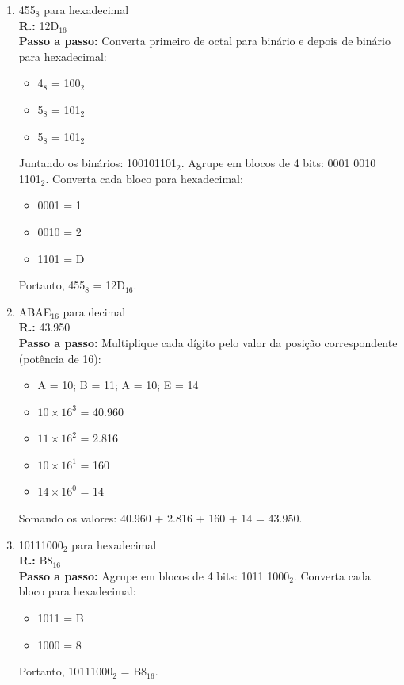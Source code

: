 \documentclass{article}[12pt]
\begin{document}
\begin{enumerate}
\begin{enumerate}
            \item 455$_8$ para hexadecimal \\
            \textbf{R.:} 12D$_{16}$ \\
            \textbf{Passo a passo:} Converta primeiro de octal para binário e depois de binário para hexadecimal:
            \begin{itemize}
                \item 4$_8$ = 100$_2$
                \item 5$_8$ = 101$_2$
                \item 5$_8$ = 101$_2$
            \end{itemize}
            Juntando os binários: 100101101$_2$. Agrupe em blocos de 4 bits: 0001 0010 1101$_2$.
            Converta cada bloco para hexadecimal:
            \begin{itemize}
                \item 0001 = 1
                \item 0010 = 2
                \item 1101 = D
            \end{itemize}
            Portanto, 455$_8$ = 12D$_{16}$.

            \item ABAE$_{16}$ para decimal \\
            \textbf{R.:} 43.950 \\
            \textbf{Passo a passo:} Multiplique cada dígito pelo valor da posição correspondente (potência de 16):
            \begin{itemize}
                \item A = 10; B = 11; A = 10; E = 14
                \item $10 \times 16^3$ = \phantom{0}40.960
                \item $11 \times 16^2$ = \phantom{00}2.816
                \item $10 \times 16^1$ = \phantom{000}160
                \item $14 \times 16^0$ = \phantom{0000}14
            \end{itemize}
            Somando os valores: 40.960 + 2.816 + 160 + 14 = 43.950.

            \item 10111000$_2$ para hexadecimal \\
            \textbf{R.:} B8$_{16}$ \\
            \textbf{Passo a passo:} Agrupe em blocos de 4 bits: 1011 1000$_2$.
            Converta cada bloco para hexadecimal:
            \begin{itemize}
                \item 1011 = B
                \item 1000 = 8
            \end{itemize}
            Portanto, 10111000$_2$ = B8$_{16}$.


\end{enumerate}
\end{enumerate}
\end{document}
